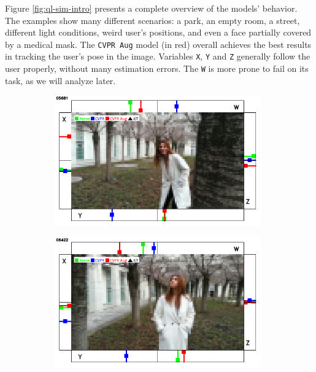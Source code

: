 Figure \ref{fig:ql-sim-intro} presents a complete overview of the models' behavior. The examples show many different scenarios: a park, an empty room, a street, different light conditions, weird user's positions, and even a face partially covered by a medical mask. The \texttt{CVPR Aug} model (in red) overall achieves the best results in tracking the user's pose in the image. Variables \texttt{X}, \texttt{Y} and \texttt{Z} generally follow the user properly, without many estimation errors. The \texttt{W} is more prone to fail on its task, as we will analyze later.

\begin{figure}[H]
	\begin{center}
		\begin{subfigure}[h]{0.49\textwidth}
			\centering
			\includegraphics[width=0.98\textwidth]{"contents/images/qualitative-videos/perfect1-square01-5681"}
		\end{subfigure}
		\hfill
		\begin{subfigure}[h]{0.49\textwidth}
			\centering
			\includegraphics[width=0.98\textwidth]{"contents/images/qualitative-videos/perfect1-square01-6422"}

\end{subfigure}
\end{center}
\end{figure}
